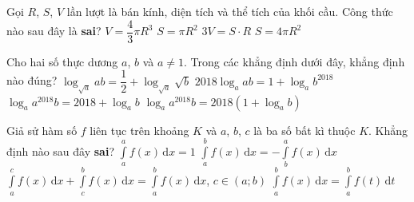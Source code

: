 \begin{ex}%
Gọi $R$, $S$, $V$ lần lượt là bán kính, diện tích và thể tích của khối cầu. Công thức nào sau đây là \textbf{sai}?
\choice
{$V=\dfrac{4}{3}\pi R^3$}
{\True $S=\pi R^2$}
{$3V=S\cdot R$}
{$S= 4\pi R^2$}
\end{ex}

\begin{ex}%
Cho hai số thực dương $a$, $b$ và $a\ne 1$. Trong các khẳng định dưới đây, khẳng định nào đúng?
\choice
{\True $\log_{\sqrt{a}}ab=\dfrac{1}{2}+\log_{\sqrt{a}}\sqrt{b}$}
{$2018\log_a ab=1+\log_ab^{2018}$}
{\True $\log_aa^{2018}b=2018+\log_ab$}
{$\log_aa^{2018}b=2018\left(1+\log_ab\right)$}
\end{ex}

\begin{ex}%
Giả sử hàm số $f$ liên tục trên khoảng $K$ và $a$, $b$, $c$ là ba số bất kì thuộc $K$. Khẳng định nào sau đây \textbf{sai}?
\choice
{\True $\displaystyle\int\limits_a^af(x)\mathrm{\,d}x=1$}
{$\displaystyle\int\limits_a^bf(x)\mathrm{\,d}x=-\displaystyle\int\limits_b^af(x)\mathrm{\,d}x$}
{$\displaystyle\int\limits_a^cf(x)\mathrm{\,d}x+\displaystyle\int\limits_c^bf(x)\mathrm{\,d}x=\displaystyle\int\limits_a^bf(x)\mathrm{\,d}x$, $c\in (a;b)$}
{$\displaystyle\int\limits_a^bf(x)\mathrm{\,d}x=\displaystyle\int\limits_a^bf(t)\mathrm{\,d}t$}
\end{ex}

